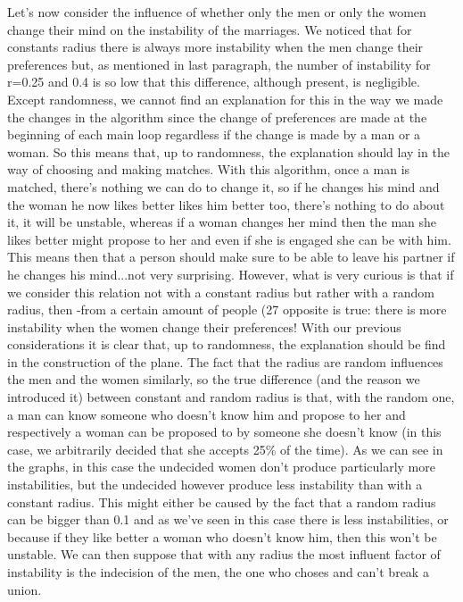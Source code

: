 \documentclass[11pt]{article}
\begin{document}
Let’s now consider the influence of whether only the men or only the women change their mind on 
the instability of the marriages. We noticed that for constants radius there is always more instability 
when the men change their preferences but, as mentioned in last paragraph, the number of 
instability for r=0.25 and 0.4 is so low that this difference, although present, is negligible. Except 
randomness, we cannot find an explanation for this in the way we made the changes in the algorithm
since the change of preferences are made at the beginning of each main loop regardless if the 
change is made by a man or a woman. So this means that, up to randomness, the explanation should 
lay in the way of choosing and making matches. With this algorithm, once a man is matched, there’s 
nothing we can do to change it, so if he changes his mind and the woman he now likes better likes
him better too, there’s nothing to do about it, it will be unstable, whereas if a woman changes her 
mind then the man she likes better might propose to her and even if she is engaged she can be with 
him. This means then that a person should make sure to be able to leave his partner if he changes his 
mind...not very surprising. However, what is very curious is that if we consider this relation not with a 
constant radius but rather with a random radius, then -from a certain amount of people (27
opposite is true: there is more instability when the women change their preferences! With our 
previous considerations it is clear that, up to randomness, the explanation should be find in the 
construction of the plane. The fact that the radius are random influences the men and the women 
similarly, so the true difference (and the reason we introduced it) between constant and random 
radius is that, with the random one, a man can know someone who doesn’t know him and propose 
to her and respectively a woman can be proposed to by someone she doesn’t know (in this case, we 
arbitrarily decided that she accepts 25\% of the time). As we can see in the graphs, in this case the 
undecided women don’t produce particularly more instabilities, but the undecided however produce 
less instability than with a constant radius. This might either be caused by the fact that a random 
radius can be bigger than 0.1 and as we’ve seen in this case there is less instabilities, or because if 
they like better a woman who doesn’t know him, then this won’t be unstable. We can then suppose 
that with any radius the most influent factor of instability is the indecision of the men, the one who
choses and can’t break a union.
\end{document}
